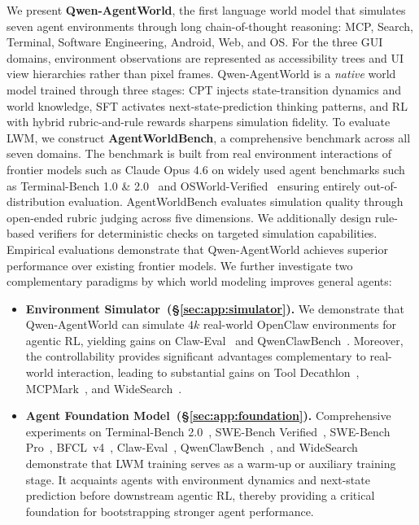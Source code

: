 \documentclass{llmxive}
\providecommand{\method}{Qwen-AgentWorld\xspace}
\providecommand{\bench}{AgentWorldBench\xspace}
\begin{document}
We present \textbf{\method}, the first language world model that simulates seven agent environments through long chain-of-thought reasoning: MCP, Search, Terminal, Software Engineering, Android, Web, and OS.
For the three GUI domains, environment observations are represented as accessibility trees and UI view hierarchies rather than pixel frames.
\method is a \emph{native} world model trained through three stages: CPT injects state-transition dynamics and world knowledge, SFT activates next-state-prediction thinking patterns, and RL with hybrid rubric-and-rule rewards sharpens simulation fidelity.
To evaluate LWM, we construct \textbf{\bench}, a comprehensive benchmark across all seven domains.
The benchmark is built from real environment interactions of frontier models such as Claude Opus 4.6 on widely used agent benchmarks such as Terminal-Bench 1.0 \& 2.0~\citep{merrill2026terminal} and OSWorld-Verified~\citep{xie2024osworld} ensuring entirely out-of-distribution evaluation.
\bench evaluates simulation quality through open-ended rubric judging across five dimensions.
We additionally design rule-based verifiers for deterministic checks on targeted simulation capabilities.
Empirical evaluations demonstrate that \method achieves superior performance over existing frontier models.
We further investigate two complementary paradigms by which world modeling improves general agents:

\begin{itemize}[leftmargin=1.5em,itemsep=2pt,topsep=0pt]

\item \textbf{Environment Simulator~(\S\ref{sec:app:simulator}).}
We demonstrate that \method can simulate $4k$ real-world OpenClaw environments for agentic RL, yielding gains on Claw-Eval~\citep{ye2026claw} and QwenClawBench~\citep{qwenclawbench}.
Moreover, the controllability provides significant advantages complementary to real-world interaction, leading to substantial gains on Tool Decathlon~\citep{li2025tool}, MCPMark~\citep{wu2025mcpmark}, and WideSearch~\citep{wong2025widesearch}.

\item \textbf{Agent Foundation Model~(\S\ref{sec:app:foundation}).}
Comprehensive experiments on Terminal-Bench 2.0~\citep{merrill2026terminal}, SWE-Bench Verified~\citep{jimenez2024swe}, SWE-Bench Pro~\citep{deng2025swe}, BFCL~v4~\citep{patil2025berkeley}, Claw-Eval~\citep{ye2026claw}, QwenClawBench~\citep{qwenclawbench}, and WideSearch~\citep{wong2025widesearch} demonstrate that LWM training serves as a warm-up or auxiliary training stage.
It acquaints agents with environment dynamics and next-state prediction before downstream agentic RL, thereby providing a critical foundation for bootstrapping stronger agent performance.


\end{itemize}
\end{document}
